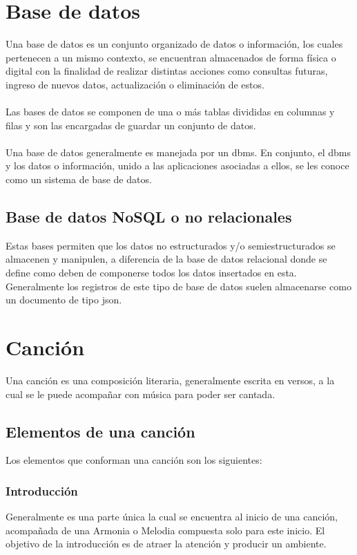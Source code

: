 \documentclass[12pt, a4paper, titlepage]{report}
\begin{document}
        \section{Base de datos}
        
        Una base de datos es un conjunto organizado de datos o información, los cuales pertenecen a un mismo contexto, se encuentran almacenados de forma física o digital con la finalidad de realizar distintas acciones como consultas futuras, ingreso de nuevos datos, actualización o eliminación de estos.\\\\
		Las bases de datos se componen de una o más tablas divididas en columnas y filas y son las encargadas de guardar un conjunto de datos.\\\\
		Una base de datos generalmente es manejada por un \acrfull{dbms}. En conjunto, el \acrshort{dbms} y los datos o información, unido a las aplicaciones asociadas a ellos, se les conoce como un sistema de base de datos.\cite{refQueEsBD}\par
			\subsection{Base de datos NoSQL o no relacionales}
			Estas bases permiten que los datos no estructurados y/o semiestructurados se almacenen y manipulen, a diferencia de la base de datos relacional donde se define como deben de componerse todos los datos insertados en esta. Generalmente los registros de este tipo de base de datos suelen almacenarse como un documento de tipo \acrshort{json}.\par
		
		\newpage
	    
	    \section{Canción}
	    Una canción es una composición literaria, generalmente escrita en versos, a la cual se le puede acompañar con música para poder ser cantada.\cite{refEstructuraCancion1}\par
			\subsection{Elementos de una canción}
			Los elementos que conforman una canción son los siguientes:

				\subsubsection*{Introducción}\par
				Generalmente es una parte única la cual se encuentra al inicio de una canción, acompañada de una \gls{Armonia} o \gls{Melodia} compuesta solo para este inicio. El objetivo de la introducción es de atraer la atención y producir un ambiente.\cite{refEstructuraCancion2}\par
\end{document}
